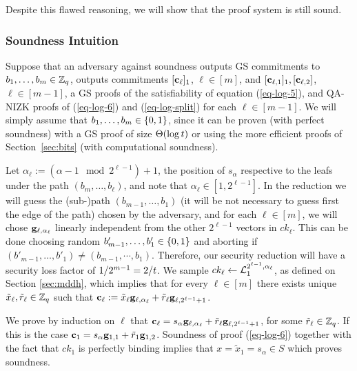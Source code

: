 Despite this flawed reasoning, we will show that the proof system is still sound.

\subsubsection{Soundness Intuition}
Suppose that an adversary against soundness outputs GS commitments to \(b_1,\ldots,b_{m}\in\mathbb{Z}_q\), outputs commitments \([\mathbf{c}_\ell]_1\), $\ell\in[m]$, and \([\mathbf{c}_{\ell,1}]_1,[\mathbf{c}_{\ell,2}]\), $\ell\in[m-1]$, a GS proofs of the satisfiability of equation (\ref{eq-log-5}), and QA-NIZK proofs of (\ref{eq-log-6}) and (\ref{eq-log-split}) for each \(\ell\in[m-1]\).
We will simply assume that \(b_1,\ldots,b_m\in\{0,1\}\), since it can be proven (with perfect soundness) with a GS proof of size \(\Theta(\log t )\) or using the more efficient proofs of Section~\ref{sec:bits} (with computational soundness).

Let $\alpha_\ell:=(\alpha-1 \mod 2^{\ell-1})+1$, the position of $s_\alpha$ respective to the leafs under the path $(b_m,\ldots, b_\ell)$, and note that $\alpha_\ell \in[1,2^{\ell-1}]$.
In the reduction we will guess the (sub-)path $(b_{m-1},\ldots, b_1)$ (it will be not necessary to guess first the edge of the path) chosen by the adversary, and for each $\ell\in[m]$, we will chose $\mathbf{g}_{\ell,\alpha_\ell}$ linearly independent from the other $2^{\ell-1}$ vectors in $ck_\ell$. This can be done choosing  random $b'_{m-1},\ldots, b'_1\in\{0,1\}$ and aborting if $(b'_{m-1},\ldots, b'_{1})\neq(b_{m-1},\cdots, b_1)$. Therefore, our security reduction will have a security loss factor of $1/2^{m-1}=2/t$. We sample $ck_\ell\gets\mathcal{L}_1^{2^{\ell-1},\alpha_\ell}$, as defined on Section \ref{sec:mddh}, which implies that for every $\ell\in[m]$ there exists unique $\tilde{x}_{\ell},\tilde{r}_\ell\in\mathbb{Z}_q$ such that $\mathbf{c}_\ell:=\tilde{x}_\ell\mathbf{g}_{\ell,\alpha_\ell}+\tilde{r}_\ell\mathbf{g}_{\ell,2^{\ell-1}+1}$.

We prove by induction on \(\ell\) that \(\mathbf{c}_\ell= s_\alpha\mathbf{g}_{\ell,\alpha_\ell}+\tilde{r}_{\ell}\mathbf{g}_{\ell,2^{\ell-1}+1}\), for some $\tilde{r}_\ell\in\mathbb{Z}_q$. If this is the case $\mathbf{c}_1=s_\alpha\mathbf{g}_{1,1}+\tilde{r}_{1}\mathbf{g}_{1,2}$. Soundness of proof (\ref{eq-log-6}) together with the fact that \(ck_1\) is perfectly binding implies that \(x=\tilde{x}_{1}=s_{\alpha}\in S\) which proves soundness.

